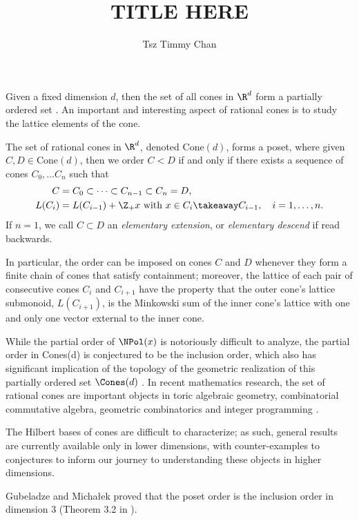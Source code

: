 \documentclass{TC}
\title{TITLE HERE}	%
\author{Tsz Timmy Chan}	%
\begin{document}
Given a fixed dimension $d$, then the set of all cones in $\R^d$ form a partially ordered set \cite{GubeladzePosetCones}.
An important and interesting aspect of rational cones is to study the lattice elements of the cone.

\begin{definition}
The set of rational cones in $\R^d$, denoted $\mathrm{Cone}(d)$, forms a poset, where given $C, D \in \mathrm{Cone}(d)$, then we order $C < D$ if and only if there exists a sequence of cones $C_0,\ldots C_n$ such that \begin{align}
C &= C_0 \subset \cdots \subset C_{n-1} \subset C_n = D,\\
L(C_i) &= L(C_{i-1})+ \Z_+x \text{ with } x \in C_i \takeaway C_{i-1},\quad i = 1, \ldots, n. \label{ConePosetCondition}
\end{align}
If $n = 1$, we call $C \subset D$ an \emph{elementary extension}, or \emph{elementary descend} if read backwards.
\end{definition}

In particular, the order can be imposed on cones $C$ and $D$ whenever they form a finite chain of cones that satisfy containment; moreover, the lattice of each pair of consecutive cones $C_i$ and $C_{i+1}$ have the property that the outer cone's lattice submonoid, $L(C_{i+1})$, is the Minkowski sum of the inner cone's lattice with one and only one vector external to the inner cone.

While the partial order of $\NPol(x)$ is notoriously difficult to analyze, the partial order in Cones(d) is conjectured to be the inclusion order, which also has significant implication of the topology of the geometric realization of this partially ordered set $\Cones(d)$ \cite{GubeladzePosetCones}.
In recent mathematics research, the set of rational cones are important objects in toric algebraic geometry, combinatorial commutative algebra, geometric combinatorics and integer programming \cite{GubeladzePosetCones, GubeladzePolytopesRingsKtheory}. 

The Hilbert bases of cones are difficult to characterize; as such, general results are currently available only in lower dimensions, with counter-examples to conjectures to inform our journey to understanding these objects in higher dimensions.

Gubeladze and Micha\l{}ek proved that the poset order is the inclusion order in dimension 3 (Theorem 3.2 in \cite{GubeladzePosetCones}).
\end{document}
